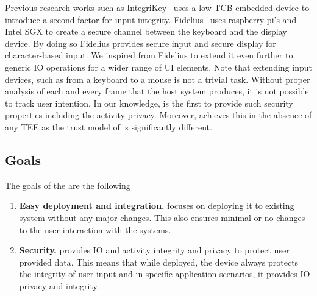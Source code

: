 Previous research works such as IntegriKey~\cite{IntegriKey} uses a low-TCB embedded device to introduce a second factor for input integrity. Fidelius~\cite{Fidelius} uses raspberry pi's and Intel SGX to create a secure channel between the keyboard and the display device. By doing so Fidelius provides secure input and secure display for character-based input. We inspired from Fidelius to extend it even further to generic IO operations for a wider range of UI elements. Note that extending input devices, such as from a keyboard to a mouse is not a trivial task. Without proper analysis of each and every frame that the host system produces, it is not possible to track user intention. In our knowledge, \name is the first to provide such security properties including the activity privacy.
Moreover, \name achieves this in the absence of any TEE as the trust model of \name is significantly different. 


\subsection{Goals}

The goals of the \name are the following

\begin{enumerate}
  \item \textbf{Easy deployment and integration.} \name focuses on deploying it to existing system without any major changes. This also ensures minimal or no changes to the user interaction with the systems.
  \item \textbf{Security.} \name provides IO and activity integrity and privacy to protect user provided data. This means that while deployed, the device always protects the integrity of user input and in specific application scenarios, it provides IO privacy and integrity.
\end{enumerate}



